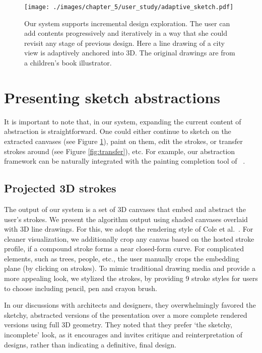 {\begin{figure}[t!]
  \vnudge
  \texttt{[image: ./images/chapter\_5/user\_study/adaptive\_sketch.pdf]}
  \caption{Our system supports incremental design exploration. The user can add contents progressively and iteratively in a way that she could revisit any stage of previous design. Here a line drawing of a city view is adaptively anchored into 3{D}. The original drawings are from a children's book illustrator.
  \label{fig:adaptive_sketch}
  }
\end{figure}



\section{Presenting sketch abstractions}

It is important to note that, in our system, expanding the current content of abstraction is straightforward. One could either continue to sketch on the extracted canvases (see Figure \ref{fig:adaptive_sketch}), paint on them, edit the strokes, or transfer strokes around (see Figure \ref{fig:transfer}), etc. For example, our abstraction framework can be naturally integrated with the painting completion tool of ~\cite{Xing:2014}.

\subsection{Projected 3D strokes}

The output of our system is a set of 3D canvases that embed and abstract the user's strokes.
We present the algorithm output using shaded canvases overlaid with 3D line drawings. For this, we adopt the rendering style of Cole et al.~\cite{Cole:2008:PDL}.  For cleaner visualization, we additionally crop any canvas based on the hosted stroke profile, if a compound stroke forms a near closed-form curve. For complicated elements, such as trees, people, etc., the user manually crops the embedding plane (by clicking on strokes).  To mimic traditional drawing media and provide a more appealing look, we stylized the strokes, by providing 9 stroke styles for users to choose including pencil, pen and crayon brush.

In our discussions with architects and designers, they overwhelmingly favored the sketchy, abstracted versions of the presentation over a more complete rendered versions using full 3D geometry. They noted that they prefer `the sketchy, incomplete' look, as it encourages and invites critique and reinterpretation of designs, rather than indicating a definitive, final design.



}
